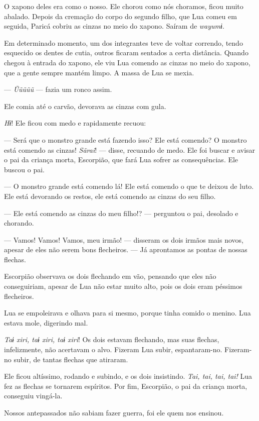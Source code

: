 O xapono deles era como o nosso. Ele chorou como nós choramos, ficou
muito abalado. Depois da cremação do corpo do segundo filho, que Lua
comeu em seguida, Paricá cobriu as cinzas no meio do xapono. Saíram
de \textit{wayumɨ}. 

Em determinado momento, um dos integrantes teve de voltar correndo,
tendo esquecido os dentes de cutia, outros ficaram sentados a certa
distância. Quando chegou à entrada do xapono, ele viu Lua comendo as
cinzas no meio do xapono, que a gente sempre mantém limpo. A massa de
Lua se mexia.

--- \textit{Ũũũũũ} --- fazia um ronco assim. 

Ele comia até o carvão, devorava as cinzas com gula. 

\textit{Hɨ}! Ele ficou com medo e rapidamente recuou: 

--- Será que o monstro grande está fazendo isso? Ele está comendo? O
monstro está comendo as cinzas! \textit{Sãrai}! --- disse, recuando de
medo. Ele foi buscar e avisar o pai da criança morta, Escorpião, que
fará Lua sofrer as consequências. Ele buscou o pai. 

--- O monstro grande está comendo lá! Ele está comendo o que te deixou de
luto. Ele está devorando os restos, ele está comendo as cinzas
do seu filho. 

--- Ele está comendo as cinzas do meu filho!? --- perguntou o pai, desolado e
chorando. 

--- Vamos! Vamos! Vamos, meu irmão! --- disseram os dois irmãos mais
novos, apesar de eles não serem bons flecheiros. --- Já aprontamos as pontas de nossas flechas. 

Escorpião observava os dois flechando em vão, pensando que eles não
conseguiriam, apesar de Lua não estar muito alto, pois os dois eram
péssimos flecheiros. 

Lua se empoleirava e olhava para si mesmo, porque tinha comido o
menino. Lua estava mole, digerindo mal. 

\textit{Taɨ xiri, taɨ xiri, taɨ xiri}! Os dois estavam flechando, mas suas
flechas, infelizmente, não acertavam o alvo. Fizeram Lua subir,
espantaram-no. Fizeram-no subir, de tantas flechas que atiraram. 

Ele ficou altíssimo, rodando e subindo, e os dois insistindo. \textit{Tai,
tai, tai, tai!} Lua fez as flechas se tornarem espíritos. Por fim,
Escorpião, o pai da criança morta, conseguiu vingá-la. 

Nossos antepassados não sabiam fazer guerra, foi ele quem nos ensinou. 

